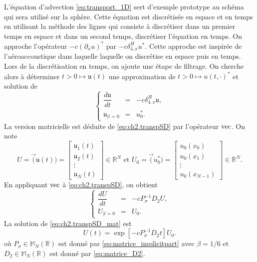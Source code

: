 L'équation d'advection \eqref{eq:transport_1D} sert d'exemple prototype au schéma qui sera utilisé sur la sphère. Cette équation est discrétisée en espace et en temps en utilisant la méthode des lignes qui consiste à discrétiser dans un premier temps en espace et dans un second temps, discrétiser l'équation en temps. On approche l'opérateur $-c (\partial_x u)^*$ par $- c \delta_{4,x}^H u^*$. Cette approche est inspirée de l'aéroaccoustique dans laquelle laquelle on discrétise en espace puis en temps. Lors de la discrétisation en temps, on ajoute une étape de filtrage.
On cherche alors à déterminer $t > 0 \mapsto \mathfrak{u}(t)$ une approximation de $t>0  \mapsto u(t,\cdot)^*$ et solution de 
\begin{equation}
\left\lbrace
\begin{array}{rcl}
\dfrac{d \mathfrak{u}}{dt} & = & - c \delta_{4,x}^H \mathfrak{u}, \\
\mathfrak{u}_{|t=0} & = & u_0^*.
\end{array}
\right.
\label{eq:ch2.transpSD}
\end{equation}
La version matricielle est déduite de \eqref{eq:ch2.transpSD} par l'opérateur $\vec$. On note
\begin{equation}
U = \vec (\mathfrak{u}(t)) = \begin{bmatrix}
\mathfrak{u}_1(t) \\
\mathfrak{u}_2(t) \\
\vdots \\
\mathfrak{u}_N(t)
\end{bmatrix} \in \mathbb{R}^N \text{ et } U_0 = \vec (u^*_0 ) = \begin{bmatrix}
u_0(x_0) \\
u_0(x_1) \\
\vdots \\
u_0(x_{N-1})
\end{bmatrix} \in \mathbb{R}^N.
\end{equation}
En appliquant $\vec$ à \eqref{eq:ch2.transpSD}, on obtient
\begin{equation}
\left\lbrace
\begin{array}{rcl}
\dfrac{d U}{dt} & = & - c P^{-1}_{\sigma} D_2 U, \\
U_{|t=0} & = & U_0.
\end{array}
\right.
\label{eq:ch2.transpSD_mat}
\end{equation}
La solution de \eqref{eq:ch2.transpSD_mat} est
\begin{equation}
U(t) = \exp\left[ - c P^{-1}_{\sigma} D_2 t\right] U_0.
\label{eq:u(t)matriciel_transp}
\end{equation}
où $P_{\sigma} \in \mathbb{M}_N(\mathbb{R})$ est donné par \eqref{eq:matrice_implicitpart} avec $\beta = 1/6$ et $D_2 \in \mathbb{M}_N(\mathbb{R})$ est donné par \eqref{eq:matrice_D2}.

